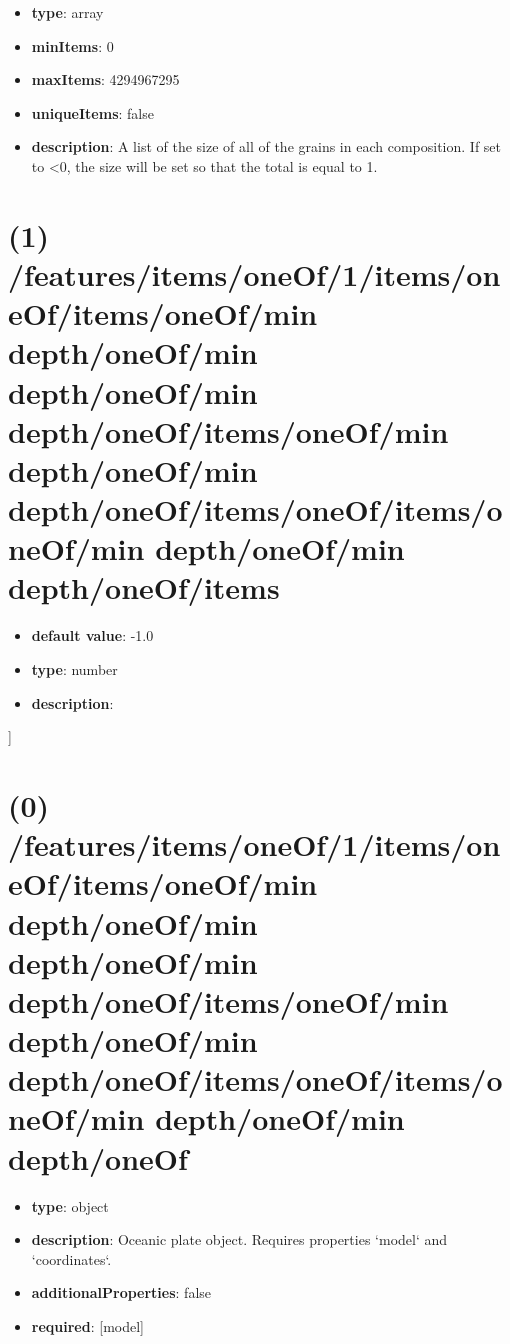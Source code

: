 \begin{itemize}[leftmargin=0em]\item {\bf type}: array
\item {\bf minItems}: 0
\item {\bf maxItems}: 4294967295
\item {\bf uniqueItems}: false
\item {\bf description}: A list of the size of all of the grains in each composition. If set to <0, the size will be set so that the total is equal to 1.
\end{itemize}\section{(1) /features/items/oneOf/1/items/oneOf/items/oneOf/min depth/oneOf/min depth/oneOf/min depth/oneOf/items/oneOf/min depth/oneOf/min depth/oneOf/items/oneOf/items/oneOf/min depth/oneOf/min depth/oneOf/items}
\begin{itemize}[leftmargin=1em]\item {\bf default value}: -1.0
\item {\bf type}: number
\item {\bf description}: 
\end{itemize}]\section{(0) /features/items/oneOf/1/items/oneOf/items/oneOf/min depth/oneOf/min depth/oneOf/min depth/oneOf/items/oneOf/min depth/oneOf/min depth/oneOf/items/oneOf/items/oneOf/min depth/oneOf/min depth/oneOf}
\begin{itemize}[leftmargin=0em]\item {\bf type}: object
\item {\bf description}: Oceanic plate object. Requires properties `model` and `coordinates`.
\item {\bf additionalProperties}: false
\item {\bf required}: [model]\end{itemize}
